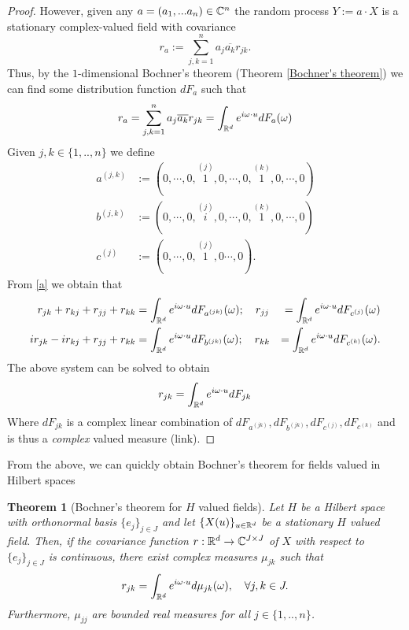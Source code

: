 \documentclass[12pt]{article}
\newtheorem{theorem}{Theorem}
\begin{document}
\begin{proof}
    However, given any $a=(a_1,...a_n)\in\mathbb{C}^n$ the random process
    $Y:=a\cdot X$ is a stationary complex-valued field with covariance
    \begin{equation*}
        r_a:=\sum_{j,k=1}^n a_j\overline{a_k}r_{jk}.
    \end{equation*}
    Thus, by the $1$-dimensional Bochner's theorem (Theorem \ref{Bochner's theorem}) we can find some distribution function $dF_a$ such that
    \begin{equation}\label{a}
        r_a= \sum_{j,k=1}^{n} a_j \overline{a_k}r_{jk}=\int_{{\mathbb R}^d}e^{i\omega\cdot u}dF_a(\omega)
    \end{equation}
    Given $j, k\in\{1,..,n\}$ we define
    \begin{align*}
        a^{(j,k)} & :=(0,\cdots,0,\overset{(j)}{1},0,\cdots,0,\overset{(k)}{1},0,\cdots,0) \\
        b^{(j,k)} & :=(0,\cdots,0,\overset{(j)}{i},0,\cdots,0,\overset{(k)}{1},0,\cdots,0) \\
        c^{(j)}   & :=(0,\cdots,0,\overset{(j)}{1},0\cdots,0).
    \end{align*}
    From \eqref{a} we obtain that
    \begin{align*}
        r_{jk}+r_{kj}+r_{jj}+r_{kk}   & =\int_{{\mathbb R}^d}e^{i\omega\cdot u}dF_{a^{(jk)}}(\omega);\quad r_{jj} & =\int_{{\mathbb R}^d}e^{i\omega\cdot u}dF_{c^{(j)}}(\omega)  \\
        ir_{jk}-ir_{kj}+r_{jj}+r_{kk} & =\int_{{\mathbb R}^d}e^{i\omega\cdot u}dF_{b^{(jk)}}(\omega);\quad r_{kk} & =\int_{{\mathbb R}^d}e^{i\omega\cdot u}dF_{c^{(k)}}(\omega).
    \end{align*}
    The above system can be solved to obtain
    \begin{equation*}
        r_{jk}=\int_{{\mathbb R}^d}e^{i\omega\cdot u}dF_{jk}
    \end{equation*}
    Where $dF_{jk}$ is a complex linear combination of $dF_{a^{(jk)}},dF_{b^{(jk)}}, dF_{c^(j)},dF_{c^{(k)}}$ and is thus a \emph{complex} valued measure (link).
\end{proof}
From the above, we can quickly obtain Bochner's theorem for fields valued in Hilbert spaces
\begin{theorem}[Bochner's theorem for $H$ valued fields]\label{bochner hilbert}
    Let $H$ be a Hilbert space with orthonormal basis $\{e_j\}_{j\in J}$ and let $\{X(u)\}_{u\in{\mathbb R}^d}$ be a stationary $H$ valued field. Then, if the covariance function $r:{\mathbb R}^d\to \mathbb{C}^{J\times J}$ of $X$ with respect to $\{e_j\}_{j\in J}$  is continuous, there exist complex measures $\mu_{jk}$ such that
    \begin{equation*}
        r_{jk}=\int_{{\mathbb R}^d} e^{i\omega \cdot u} d\mu _{j k}(\omega),\quad \forall j,k\in{J}.
    \end{equation*}
    Furthermore, $\mu_{jj}$ are bounded real measures for all $j\in\{1,..,n\}$.
\end{theorem}
\end{document}
